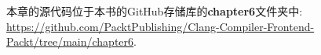 
本章的源代码位于本书的GitHub存储库的\textbf{chapter6}文件夹中: \url{https://github.com/PacktPublishing/Clang-Compiler-Frontend-Packt/tree/main/chapter6}.

